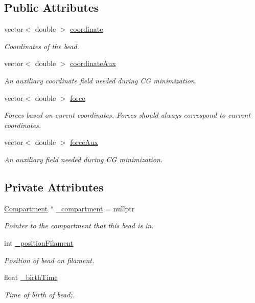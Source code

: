 \subsection*{Public Attributes}
\begin{DoxyCompactItemize}
\item 
vector$<$ double $>$ \hyperlink{classBead_a8c9c7d97a682694bf3b16a0922b23786}{coordinate}
\begin{DoxyCompactList}\small\item\em Coordinates of the bead. \end{DoxyCompactList}\item 
vector$<$ double $>$ \hyperlink{classBead_a4d46596f52ee0ce95e3e717483e1a921}{coordinate\+Aux}
\begin{DoxyCompactList}\small\item\em An auxiliary coordinate field needed during C\+G minimization. \end{DoxyCompactList}\item 
vector$<$ double $>$ \hyperlink{classBead_afc556d77d1d80e11c1256e89bba0db66}{force}
\begin{DoxyCompactList}\small\item\em Forces based on curent coordinates. Forces should always correspond to current coordinates. \end{DoxyCompactList}\item 
vector$<$ double $>$ \hyperlink{classBead_a59758227cd7afbb3ec5fbcafe32773b8}{force\+Aux}
\begin{DoxyCompactList}\small\item\em An auxiliary field needed during C\+G minimization. \end{DoxyCompactList}\end{DoxyCompactItemize}
\subsection*{Private Attributes}
\begin{DoxyCompactItemize}
\item 
\hyperlink{classCompartment}{Compartment} $\ast$ \hyperlink{classBead_ac9d2080d5d8f80f60535dfeea9cd38e9}{\+\_\+compartment} = nullptr
\begin{DoxyCompactList}\small\item\em Pointer to the compartment that this bead is in. \end{DoxyCompactList}\item 
int \hyperlink{classBead_a0eafb8f259549846d4714e6120cbc87c}{\+\_\+position\+Filament}
\begin{DoxyCompactList}\small\item\em Position of bead on filament. \end{DoxyCompactList}\item 
float \hyperlink{classBead_a356c8525fcf176bca4cd539f735c1de6}{\+\_\+birth\+Time}
\begin{DoxyCompactList}\small\item\em Time of birth of bead;. \end{DoxyCompactList}\end{DoxyCompactItemize}


